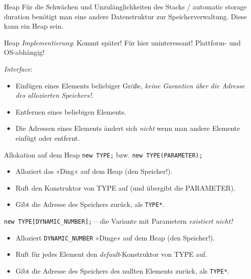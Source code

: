 \begin{frame}{Heap}
	Für die Schwächen und Unzulänglichkeiten des Stacks / automatic storage duration benötigt man eine andere Datenstruktur zur Speicherverwaltung.
	Diese kann ein Heap sein.
	
	\pause
	
	\begin{block}{Heap}
		\emph{Implementierung}: Kommt später! Für hier uninteressant! Plattform- und OS-abhängig!
		
		\pause
		
		\emph{Interface}:
		\begin{itemize}
			\item Einfügen eines Elements beliebiger Größe, \emph{keine Garantien über die Adresse des allozierten Speichers!}.
			\item Entfernen eines beliebigen Elements.
			\item Die Adressen eines Elements ändert sich \emph{nicht} wenn man andere Elemente einfügt oder entfernt.
		\end{itemize}
	\end{block}
\end{frame}

\begin{frame}[fragile]{Allokation auf dem Heap}
	\verb|new TYPE;| bzw. \verb|new TYPE(PARAMETER);|
	\begin{itemize}
		\item Alloziert das »Ding« auf dem Heap (den Speicher!).
		\item Ruft den Konstruktor von TYPE auf (und übergibt die PARAMETER).
		\item Gibt die Adresse des Speichers zurück, als \verb|TYPE*|.
	\end{itemize}
	
	\hspace*{3em}
	
	\verb|new TYPE[DYNAMIC_NUMBER];| -- die Variante mit Parametern \emph{existiert nicht!}
	\begin{itemize}
		\item Alloziert \verb|DYNAMIC_NUMBER| »Dinge« auf dem Heap (den Speicher!).
		\item Ruft für jedes Element den \emph{default}-Konstruktor von TYPE auf.
		\item Gibt die Adresse des Speichers des nullten Elements zurück, als \verb|TYPE*|.
	\end{itemize}
\end{frame}

